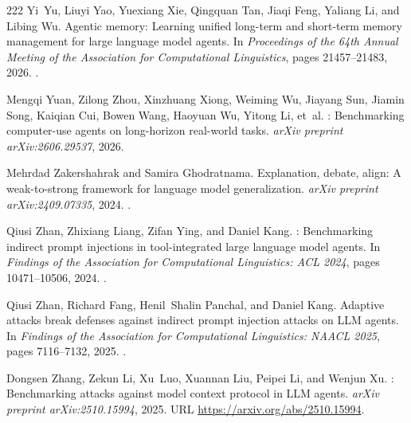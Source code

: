 \begin{thebibliography}{222}
Yi~Yu, Liuyi Yao, Yuexiang Xie, Qingquan Tan, Jiaqi Feng, Yaliang Li, and
  Libing Wu.
\newblock Agentic memory: Learning unified long-term and short-term memory
  management for large language model agents.
\newblock In \emph{Proceedings of the 64th Annual Meeting of the Association
  for Computational Linguistics}, pages 21457--21483, 2026.
\newblock {}.

Mengqi Yuan, Zilong Zhou, Xinzhuang Xiong, Weiming Wu, Jiayang Sun, Jiamin
  Song, Kaiqian Cui, Bowen Wang, Haoyuan Wu, Yitong Li, et~al.
: Benchmarking computer-use agents on long-horizon
  real-world tasks.
\newblock \emph{arXiv preprint arXiv:2606.29537}, 2026.

Mehrdad Zakershahrak and Samira Ghodratnama.
\newblock Explanation, debate, align: A weak-to-strong framework for language
  model generalization.
\newblock \emph{arXiv preprint arXiv:2409.07335}, 2024.
\newblock {}.

Qiusi Zhan, Zhixiang Liang, Zifan Ying, and Daniel Kang.
: Benchmarking indirect prompt injections in
  tool-integrated large language model agents.
\newblock In \emph{Findings of the Association for Computational Linguistics:
  ACL 2024}, pages 10471--10506, 2024.
\newblock {}.

Qiusi Zhan, Richard Fang, Henil~Shalin Panchal, and Daniel Kang.
\newblock Adaptive attacks break defenses against indirect prompt injection
  attacks on {LLM} agents.
\newblock In \emph{Findings of the Association for Computational Linguistics:
  NAACL 2025}, pages 7116--7132, 2025.
\newblock {}.

Dongsen Zhang, Zekun Li, Xu~Luo, Xuannan Liu, Peipei Li, and Wenjun Xu.
: Benchmarking attacks against model
  context protocol in {LLM} agents.
\newblock \emph{arXiv preprint arXiv:2510.15994}, 2025{}.
\newblock URL \url{https://arxiv.org/abs/2510.15994}.


\end{thebibliography}

